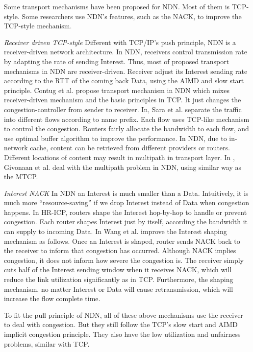 
Some transport mechanisms have been proposed for NDN. Most of them is TCP-style. Some researchers use NDN's features, such as the NACK, to improve the TCP-style mechanism.

\emph{Receiver driven TCP-style} Different with TCP/IP's push principle, NDN is a receiver-driven network architecture. In NDN, receivers control transmission rate by adapting the rate of sending Interest. Thus, most of proposed transport mechanisms in NDN are receiver-driven. Receiver adjust its Interest sending rate according to the RTT of the coming back Data, using the AIMD and slow start principle. Contug et al.\cite{Contug} propose transport mechanism in NDN which mixes receiver-driven mechanism and the basic principles in TCP. It just changes the congestion-controller from sender to receiver. In\cite{Flow}, Sara et al. separate the traffic into different flows according to name prefix. Each flow uses TCP-like mechanism to control the congestion. Routers fairly allocate the bandwidth to each flow, and use optimal buffer algorithm to improve the performance. In NDN, due to in-network cache, content can be retrieved from different providers or routers. Different locations of content may result in multipath in transport layer. In \cite{Multipath}, Givonaan et al. deal with the multipath problem in NDN, using similar way as the MTCP.

\emph{Interest NACK} In NDN an Interest is much smaller than a Data. Intuitively, it is much more ``resource-saving'' if we drop Interest instead of Data when congestion happens. In HR-ICP\cite{shape}, routers shape the Interest hop-by-hop to handle or prevent congestion. Each router shapes Interest just by itself, according the bandwidth it can supply to incoming Data. In \cite{improveshape} Wang et al. improve the Interest shaping mechanism as follows. Once an Interest is shaped, router sends NACK back to the receiver to inform that congestion has occurred. Although NACK implies congestion, it does not inform how severe the congestion is. The receiver simply cuts half of the Interest sending window when it receives NACK, which will reduce the link utilization significantly as in TCP. Furthermore, the shaping mechanism, no matter Interest or Data will cause retransmission, which will increase the flow complete time.

To fit the pull principle of NDN, all of these above mechanisms use the receiver to deal with congestion. But they still follow the TCP's slow start and AIMD implicit congestion principle. They also have the low utilization and unfairness problems, similar with TCP\cite{NDNanalysis}.

